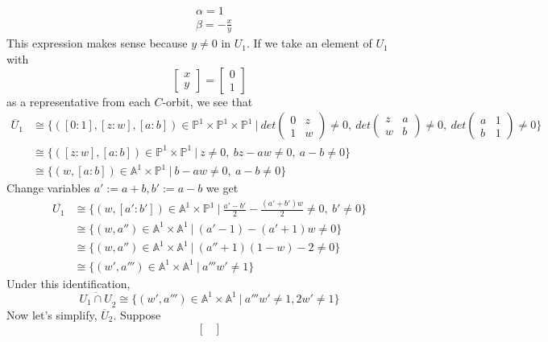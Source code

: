 \begin{example}
	\begin{align*}
		&\alpha=1\\
		&\beta=-\frac{x}{y}
	\end{align*}
This expression makes sense because $y\neq 0$ in $U_1$.
If we take an element of $U_1$ with 
\[
	\begin{bmatrix}
		x\\
		y
	\end{bmatrix}
	=
	\begin{bmatrix}
		0\\
		1
	\end{bmatrix}	
\]
as a representative from each $C$-orbit, we see that 
\begin{align*}
	\overline{U}_1
	&\cong
	\{
	([0:1],[z:w],[a:b])\in \mathbb{P}^1 \times \mathbb{P}^1\times \mathbb{P}^1~|~
	det	
	\begin{pmatrix}
	0&z\\
	1&w
	\end{pmatrix}
	\neq 0,~
	det	
	\begin{pmatrix}
	z&a\\
	w&b
	\end{pmatrix}
	\neq 0,~
	det	
	\begin{pmatrix}
	a&1\\
	b&1
	\end{pmatrix}
	\neq 0	 	
	\}	
	\\
	&\cong
	\{
	([z:w],[a:b])\in \mathbb{P}^1\times \mathbb{P}^1~|~
	z\neq 0,~
	bz-aw\neq 0,~
	a-b\neq 0	 	
	\}\\
	&\cong
	\{
	(w,[a:b])\in \mathbb{A}^1\times \mathbb{P}^1~|~
	b-aw\neq 0,~
	a-b\neq 0	 	
	\}	
\end{align*}
Change variables $a':=a+b,b':=a-b$ we get
\begin{align*}
	\overline{U_1}
	&\cong
	\{
	(w,[a':b'])\in \mathbb{A}^1\times \mathbb{P}^1~|~
	\frac{a'-b'}{2}-\frac{(a'+b')w}{2}\neq 0,~
	b'\neq 0	 	
	\}\\
	&\cong
	\{
	(w,a'')\in \mathbb{A}^1\times \mathbb{A}^1~|~
	(a'-1)-(a'+1)w\neq 0 	
	\}\\
	&\cong
	\{
	(w,a'')\in \mathbb{A}^1\times \mathbb{A}^1~|~
	(a''+1)(1-w)-2\neq 0 	
	\}\\
	&\cong
	\{
	(w',a''')\in \mathbb{A}^1\times \mathbb{A}^1~|~
	a'''w'\neq 1 	
	\}
\end{align*}
Under this identification,
\[
	\overline{U_1\cap U}_2
	\cong
	\{
	(w',a''')\in \mathbb{A}^1\times \mathbb{A}^1~|~
	a'''w'\neq 1, 2w'\neq 1 	
	\}
\]
Now let's simplify, $ \overline{U}_2 $. Suppose
\[
	\begin{bmatrix}

\end{bmatrix}\]
\end{example}
